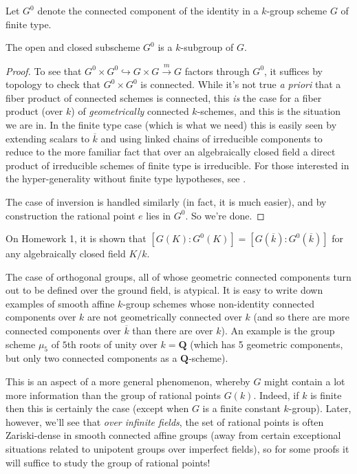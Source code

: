 \documentclass[10pt]{article}
\newcommand{\QQ}{\mathbf{Q}}
\renewcommand{\(}{\left(}
\renewcommand{\)}{\right)}
\renewcommand{\bar}{\overline}
\newcommand{\into}{\hookrightarrow}
\numberwithin{thm}{subsection}
\begin{document}
Let $G^0$ denote the connected component of the identity in a $k$-group scheme 
$G$ of finite type. 

\begin{prop}The open and closed subscheme $G^0$ is a $k$-subgroup of $G$.
\end{prop}
\begin{proof}
To see that $G^0\times G^0\into G\times G\stackrel{m}{\to} G$
factors through $G^0$, it suffices by topology to check that $G^0\times G^0$
is connected. While it's not true \textit{a priori} that a fiber product
of connected schemes is connected, this \textit{is} the case for a fiber product (over $k$)
of \textit{geometrically} connected $k$-schemes, and this is the situation we are in.
In the finite type case (which is what we need) this is easily seen by extending scalars to
$\bar k$ and using linked chains of irreducible components to reduce to the more
familiar fact that over an algebraically closed field a direct product of irreducible schemes of finite type
is irreducible.  For those interested in the hyper-generality without finite type
hypotheses, see \cite[IV$_2$, 4.5.8]{ega}.

The case of inversion is handled similarly (in fact, it is much easier), 
and by construction the rational point $e$ lies in $G^0$. So we're done.
\end{proof}

On Homework 1, it is shown that $[G(K):G^0(K)]=[G(\bar k):G^0(\bar k)]$
for any algebraically closed field $K/k$.


\begin{rem}The case of orthogonal groups, all of whose geometric
connected components turn out to be defined over the ground field, is atypical. 
It is easy to write down examples of smooth affine $k$-group schemes whose non-identity connected 
components over $k$ are not geometrically connected over $k$
(and so there are more connected components over $\bar k$ than there are over $k$).
An example is the group scheme $\mu_5$ of $5$th roots of unity over $k=\QQ$
(which has 5 geometric components, but only two connected components as a $\QQ$-scheme).

This is an aspect of a more general phenomenon, whereby $G$ might contain a lot more information than the group of rational points $G(k)$. Indeed, if $k$ is finite then this is certainly the case (except when $G$ is a finite constant 
$k$-group). Later, however, we'll see that \textit{over infinite fields}, the set of rational points is often Zariski-dense
in smooth connected affine groups 
(away from certain exceptional situations related to unipotent groups over
imperfect fields), 
so for some proofs it will suffice to study the group of rational points!
\end{rem}
\end{document}
